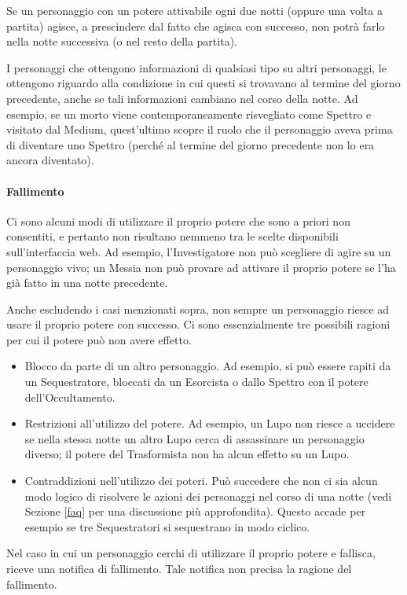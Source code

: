 \documentclass[a4paper,10pt]{article}
\begin{document}
Se un personaggio con un potere attivabile ogni due notti (oppure una volta a partita) agisce, a prescindere dal fatto che agisca con successo, non potrà farlo nella notte successiva (o nel resto della partita).

I personaggi che ottengono informazioni di qualsiasi tipo su altri personaggi, le ottengono riguardo alla condizione in cui questi si trovavano al termine del giorno precedente, anche se tali informazioni cambiano nel corso della notte.
Ad esempio, se un morto viene contemporaneamente risvegliato come Spettro e visitato dal Medium, quest'ultimo scopre il ruolo che il personaggio aveva prima di diventare uno Spettro (perché al termine del giorno precedente non lo era ancora diventato).


\paragraph{Fallimento} Ci sono alcuni modi di utilizzare il proprio potere che sono a priori non consentiti, e pertanto non risultano nemmeno tra le scelte disponibili sull'interfaccia web. Ad esempio, l'Investigatore non può scegliere di agire su un personaggio vivo; un Messia non può provare ad attivare il proprio potere se l'ha già fatto in una notte precedente.

Anche escludendo i casi menzionati sopra, non sempre un personaggio riesce ad usare il proprio potere con successo. Ci sono essenzialmente tre possibili ragioni per cui il potere può non avere effetto.

\begin{itemize}
	\item Blocco da parte di un altro personaggio. Ad esempio, si può essere rapiti da un Sequestratore, bloccati da un Esorcista o dallo Spettro con il potere dell'Occultamento.
	\item Restrizioni all'utilizzo del potere. Ad esempio, un Lupo non riesce a uccidere se nella stessa notte un altro Lupo cerca di assassinare un personaggio diverso; il potere del Trasformista non ha alcun effetto su un Lupo.
	\item Contraddizioni nell'utilizzo dei poteri. Può succedere che non ci sia alcun modo logico di risolvere le azioni dei personaggi nel corso di una notte (vedi Sezione \ref{faq} per una discussione più approfondita). Questo accade per esempio se tre Sequestratori si sequestrano in modo ciclico.
\end{itemize}
Nel caso in cui un personaggio cerchi di utilizzare il proprio potere e fallisca, riceve una notifica di fallimento. Tale notifica non precisa la ragione del fallimento.
\end{document}
